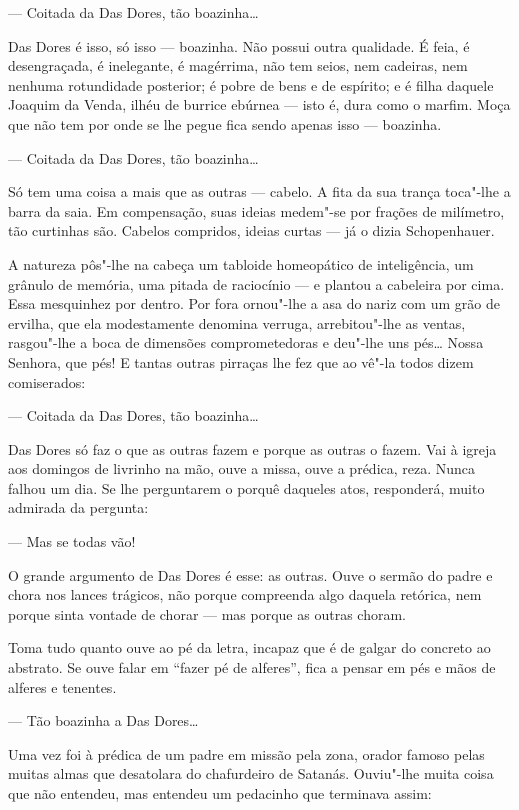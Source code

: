 --- Coitada da Das Dores, tão boazinha\ldots{}

Das Dores é isso, só isso --- boazinha. Não possui outra qualidade. É
feia, é desengraçada, é inelegante, é magérrima, não tem seios, nem
cadeiras, nem nenhuma rotundidade posterior; é pobre de bens e de
espírito; e é filha daquele Joaquim da Venda, ilhéu de burrice ebúrnea
--- isto é, dura como o marfim. Moça que não tem por onde se lhe pegue
fica sendo apenas isso --- boazinha.

--- Coitada da Das Dores, tão boazinha\ldots{}

Só tem uma coisa a mais que as outras --- cabelo. A fita da sua trança
toca"-lhe a barra da saia. Em compensação, suas ideias medem"-se por
frações de milímetro, tão curtinhas são. Cabelos compridos, ideias
curtas --- já o dizia Schopenhauer.

A natureza pôs"-lhe na cabeça um tabloide homeopático de inteligência, um
grânulo de memória, uma pitada de raciocínio --- e plantou a cabeleira
por cima. Essa mesquinhez por dentro. Por fora ornou"-lhe a asa do nariz
com um grão de ervilha, que ela modestamente denomina verruga,
arrebitou"-lhe as ventas, rasgou"-lhe a boca de dimensões comprometedoras
e deu"-lhe uns pés\ldots{} Nossa Senhora, que pés! E tantas outras pirraças
lhe fez que ao vê"-la todos dizem comiserados:

--- Coitada da Das Dores, tão boazinha\ldots{}

Das Dores só faz o que as outras fazem e porque as outras o fazem. Vai à
igreja aos domingos de livrinho na mão, ouve a missa, ouve a prédica,
reza. Nunca falhou um dia. Se lhe perguntarem o porquê daqueles atos,
responderá, muito admirada da pergunta:

--- Mas se todas vão!

O grande argumento de Das Dores é esse: as outras. Ouve o sermão do
padre e chora nos lances trágicos, não porque compreenda algo daquela
retórica, nem porque sinta vontade de chorar --- mas porque as outras
choram.

Toma tudo quanto ouve ao pé da letra, incapaz que é de galgar do
concreto ao abstrato. Se ouve falar em ``fazer pé de alferes'', fica a
pensar em pés e mãos de alferes e tenentes.

--- Tão boazinha a Das Dores\ldots{}

Uma vez foi à prédica de um padre em missão pela zona, orador famoso
pelas muitas almas que desatolara do chafurdeiro de Satanás. Ouviu"-lhe
muita coisa que não entendeu, mas entendeu um pedacinho que terminava
assim:

